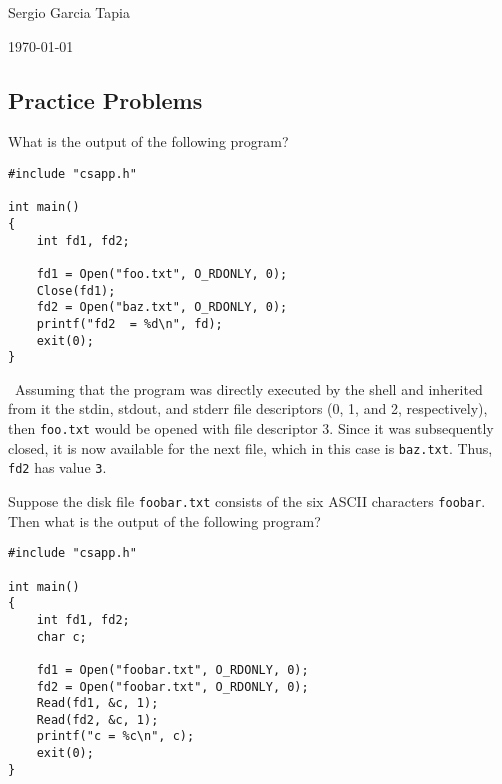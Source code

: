 \documentclass[12pt]{article}
\newenvironment{ex}[2][Exercise]{\begin{trivlist}
		\item[\hskip \labelsep {\bfseries #1}\hskip \labelsep {\bfseries #2.}]}{\end{trivlist}}
\newenvironment{sol}[1][Solution]{\begin{trivlist}
		\item[\hskip \labelsep {\bfseries #1:}]}{\end{trivlist}}
\begin{document}

\noindent Sergio Garcia Tapia \hfill

 \hfill


\noindent\today

\subsection*{Practice Problems}

\begin{ex}{10.1}
	What is the output of the following program?
	\begin{lstlisting}
#include "csapp.h"

int main()
{
	int fd1, fd2;
	
	fd1 = Open("foo.txt", O_RDONLY, 0);
	Close(fd1);
	fd2 = Open("baz.txt", O_RDONLY, 0);
	printf("fd2  = %d\n", fd);
	exit(0);
}
	\end{lstlisting}
\end{ex}

\begin{sol}
	\
	Assuming that the program was directly executed by the shell and inherited from it the
	stdin, stdout, and stderr file descriptors (0, 1, and 2, respectively), then \texttt{foo.txt}
	would be opened with file descriptor 3. Since it was subsequently closed, it is now available
	for the next file, which in this case is \texttt{baz.txt}. Thus, \texttt{fd2} has value \texttt{3}.
\end{sol}

\begin{ex}{10.2}
	Suppose the disk file \texttt{foobar.txt} consists of the six ASCII characters \texttt{foobar}.
	Then what is the output of the following program?
	\begin{lstlisting}
#include "csapp.h"

int main()
{
	int fd1, fd2;
	char c;
	
	fd1 = Open("foobar.txt", O_RDONLY, 0);
	fd2 = Open("foobar.txt", O_RDONLY, 0);
	Read(fd1, &c, 1);
	Read(fd2, &c, 1);
	printf("c = %c\n", c);
	exit(0);
}
	\end{lstlisting}
\end{ex}
\end{document}
